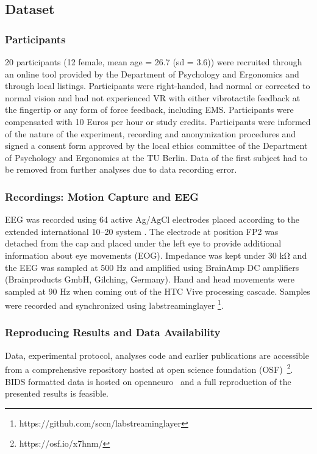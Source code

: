 \subsection{Dataset}
\subsubsection{Participants}
20 participants (12 female, mean age = 26.7 (sd = 3.6)) were recruited through an online tool provided by the Department of Psychology and Ergonomics and through local listings. Participants were right-handed, had normal or corrected to normal vision and had not experienced VR with either vibrotactile feedback at the fingertip or any form of force feedback, including EMS. Participants were compensated with 10 Euros per hour or study credits. Participants were informed of the nature of the experiment, recording and anonymization procedures and signed a consent form approved by the local ethics committee of the Department of Psychology and Ergonomics at the TU Berlin. Data of the first subject had to be removed from further analyses due to data recording error. 


\subsubsection{Recordings: Motion Capture and EEG}
EEG was recorded using 64 active Ag/AgCl electrodes placed according to the extended international 10–20 system \cite{Chatrian1985a}. The electrode at position FP2 was detached from the cap and placed under the left eye to provide additional information about eye movements (EOG). Impedance was kept under 30 \si{\kohm} and the EEG was sampled at 500 Hz and amplified using BrainAmp DC amplifiers (Brainproducts GmbH, Gilching, Germany). Hand and head movements were sampled at 90 Hz when coming out of the HTC Vive processing cascade. Samples were recorded and synchronized using labstreaminglayer \footnote{https://github.com/sccn/labstreaminglayer}.

\subsubsection{Reproducing Results and Data Availability}
Data, experimental protocol, analyses code and earlier publications are accessible from a comprehensive repository hosted at open science foundation (OSF)~\footnote{https://osf.io/x7hnm/}. BIDS formatted data is hosted on openneuro~\cite{} and a full reproduction of the presented results is feasible.

